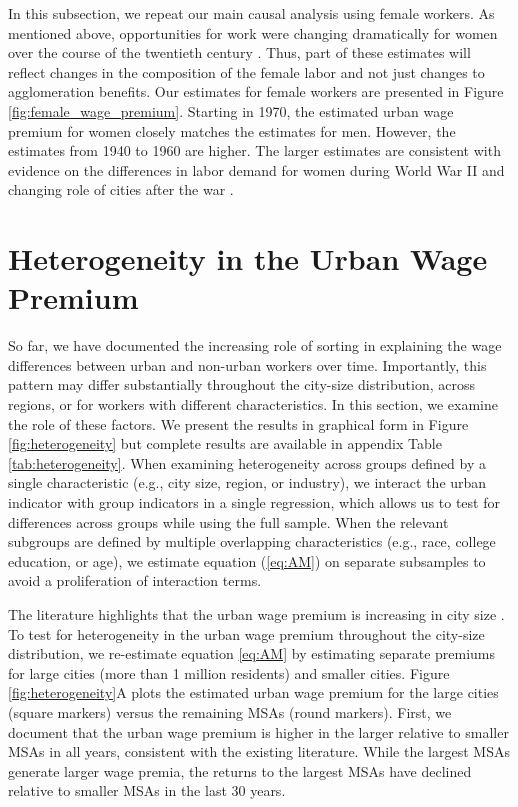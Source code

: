 \documentclass[12pt]{article}
\begin{document}
In this subsection, we repeat our main causal analysis using female workers.
As mentioned above, opportunities for work were changing dramatically for women over the course of the twentieth century \citep{goldin2006quiet}. 
Thus, part of these estimates will reflect changes in the composition of the female labor and not just changes to agglomeration benefits.
Our estimates for female workers are presented in Figure \ref{fig:female_wage_premium}. 
Starting in 1970, the estimated urban wage premium for women closely matches the estimates for men.
However, the estimates from 1940 to 1960 are higher. 
The larger estimates are consistent with evidence on the differences in labor demand for women during World War II \citep*{goldin1991role,acemoglu2004women,goldin2013shocking,bellou2016occupations,jaworski2014you} and changing role of cities after the war
\citep*{costa2000power,boustan2013population}. 

\section{Heterogeneity in the Urban Wage Premium}

So far, we have documented the increasing role of sorting in explaining the wage differences between urban and non-urban workers over time.
Importantly, this pattern may differ substantially throughout the city-size distribution, across regions, or for workers with different characteristics.
In this section, we examine the role of these factors.
We present the results in graphical form in Figure \ref{fig:heterogeneity} but complete results are available in appendix Table \ref{tab:heterogeneity}.
When examining heterogeneity across groups defined by a single characteristic (e.g., city size, region, or industry), we interact the urban indicator with group indicators in a single regression, which allows us to test for differences across groups while using the full sample. 
When the relevant subgroups are defined by multiple overlapping characteristics (e.g., race, college education, or age), we estimate equation (\ref{eq:AM}) on separate subsamples to avoid a proliferation of interaction terms.
 
The literature highlights that the urban wage premium is increasing in city size \citep[e.g.][]{BaumSnow_Pavan_2012}.
To test for heterogeneity in the urban wage premium throughout the city-size distribution, we re-estimate equation \eqref{eq:AM} by estimating separate premiums for large cities (more than 1 million residents) and smaller cities.
Figure \ref{fig:heterogeneity}A plots the estimated urban wage premium for the large cities (square markers) versus the remaining MSAs (round markers).
First, we document that the urban wage premium is higher in the larger relative to smaller MSAs in all years, consistent with the existing literature.
While the largest MSAs generate larger wage premia, the returns to the largest MSAs have declined relative to smaller MSAs in the last 30 years. 
\end{document}
